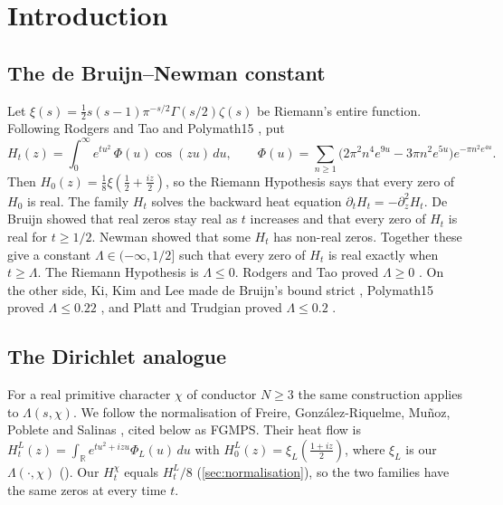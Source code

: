 \documentclass[11pt]{article}
\theoremstyle{definition}
\newcommand{\R}{\mathbb{R}}
\newcommand{\Lc}{\Lambda}
\begin{document}
\section{Introduction}\label{sec:intro}

\subsection{The de Bruijn--Newman constant}

Let $\xi(s) = \tfrac12 s(s-1)\pi^{-s/2}\Gamma(s/2)\zeta(s)$ be Riemann's entire function. Following Rodgers and Tao \cite{RodgersTao2020} and Polymath15 \cite{Polymath2019}, put
\begin{equation}\label{eq:Hzeta}
H_t(z) = \int_0^\infty e^{tu^2}\,\Phi(u)\cos(zu)\,du,\qquad
\Phi(u) = \sum_{n\ge1}\bigl(2\pi^2n^4e^{9u} - 3\pi n^2e^{5u}\bigr)e^{-\pi n^2e^{4u}} .
\end{equation}
Then $H_0(z) = \tfrac18\xi(\tfrac12 + \tfrac{iz}{2})$, so the Riemann Hypothesis says that every zero of $H_0$ is real. The family $H_t$ solves the backward heat equation $\partial_t H_t = -\partial_z^2 H_t$. De Bruijn \cite{deBruijn1950} showed that real zeros stay real as $t$ increases and that every zero of $H_t$ is real for $t \ge 1/2$. Newman \cite{Newman1976} showed that some $H_t$ has non-real zeros. Together these give a constant $\Lc \in (-\infty, 1/2]$ such that every zero of $H_t$ is real exactly when $t \ge \Lc$. The Riemann Hypothesis is $\Lc \le 0$. Rodgers and Tao proved $\Lc \ge 0$ \cite{RodgersTao2020}. On the other side, Ki, Kim and Lee made de Bruijn's bound strict \cite{KKL2009}, Polymath15 proved $\Lc \le 0.22$ \cite{Polymath2019}, and Platt and Trudgian proved $\Lc \le 0.2$ \cite{PlattTrudgian2021}.

\subsection{The Dirichlet analogue}

For a real primitive character $\chi$ of conductor $N \ge 3$ the same construction applies to $\Lc(s,\chi)$. We follow the normalisation of Freire, Gonz\'alez-Riquelme, Mu\~noz, Poblete and Salinas \cite{FGMPS2026}, cited below as FGMPS. Their heat flow is $H^L_t(z) = \int_\R e^{tu^2+izu}\Phi_L(u)\,du$ with $H^L_0(z) = \xi_L(\tfrac{1+iz}{2})$, where $\xi_L$ is our $\Lc(\cdot,\chi)$ (\cite[(1.2), (1.3), (2.6)]{FGMPS2026}). Our $H^\chi_t$ equals $H^L_t/8$ (\cref{sec:normalisation}), so the two families have the same zeros at every time $t$.
\end{document}
